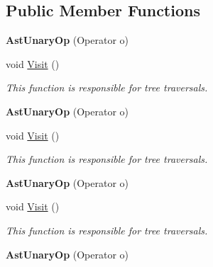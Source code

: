 \subsection*{Public Member Functions}
\begin{DoxyCompactItemize}
\item 
\hypertarget{classAstUnaryOp_aa363b2df2fbb4653a683899e59df2080}{{\bfseries Ast\-Unary\-Op} (Operator o)}\label{classAstUnaryOp_aa363b2df2fbb4653a683899e59df2080}

\item 
void \hyperlink{classAstUnaryOp_a23e13d42f33d5882d58ca48e8053f1a0}{Visit} ()
\begin{DoxyCompactList}\small\item\em This function is responsible for tree traversals. \end{DoxyCompactList}\item 
\hypertarget{classAstUnaryOp_aa363b2df2fbb4653a683899e59df2080}{{\bfseries Ast\-Unary\-Op} (Operator o)}\label{classAstUnaryOp_aa363b2df2fbb4653a683899e59df2080}

\item 
void \hyperlink{classAstUnaryOp_a23e13d42f33d5882d58ca48e8053f1a0}{Visit} ()
\begin{DoxyCompactList}\small\item\em This function is responsible for tree traversals. \end{DoxyCompactList}\item 
\hypertarget{classAstUnaryOp_aa363b2df2fbb4653a683899e59df2080}{{\bfseries Ast\-Unary\-Op} (Operator o)}\label{classAstUnaryOp_aa363b2df2fbb4653a683899e59df2080}

\item 
void \hyperlink{classAstUnaryOp_a23e13d42f33d5882d58ca48e8053f1a0}{Visit} ()
\begin{DoxyCompactList}\small\item\em This function is responsible for tree traversals. \end{DoxyCompactList}\item 
\hypertarget{classAstUnaryOp_aa363b2df2fbb4653a683899e59df2080}{{\bfseries Ast\-Unary\-Op} (Operator o)}\label{classAstUnaryOp_aa363b2df2fbb4653a683899e59df2080}


\end{DoxyCompactItemize}
